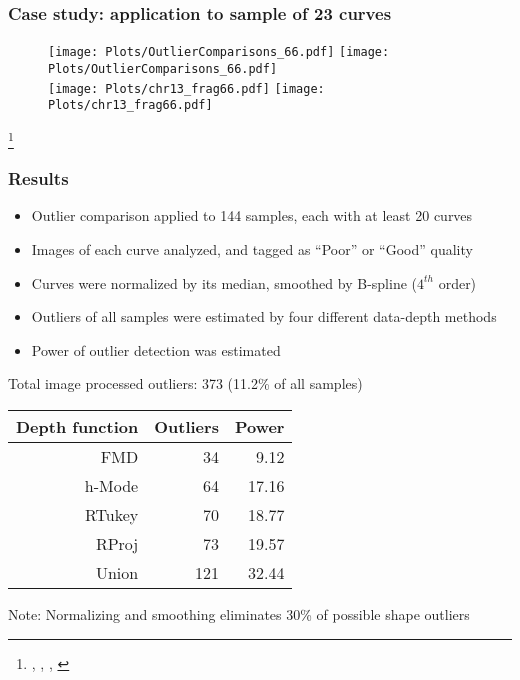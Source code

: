 \documentclass[10pt,dvipsnames,table]{beamer}
\begin{document}
\begin{frame}
\frametitle{Case study: application to sample of 23 curves}
\vspace{-0.5cm}
\begin{figure}[t]
\texttt{[image: Plots/OutlierComparisons\_66.pdf]}
\hspace{0.5cm}
\pause
\texttt{[image: Plots/OutlierComparisons\_66.pdf]} \\
\texttt{[image: Plots/chr13\_frag66.pdf]}
\pause
\hspace{0.5cm}
\pause
\texttt{[image: Plots/chr13\_frag66.pdf]}
\end{figure}
\footnote{\cite{Febrero-Bande_delaFuente_2012_JSS}, \cite{R-fda}, \cite{Ramsay_Silverman_2002_Applied}, \cite{Ramsay_etal_2009_Functional_R}}
\end{frame}

\begin{frame}
\frametitle{Results}
\begin{itemize}
\item Outlier comparison applied to 144 samples, each with at least 20 curves
\item Images of each curve analyzed, and tagged as ``Poor'' or ``Good'' quality
\item Curves were normalized by its median, smoothed by B-spline ($4^{th}$ order)
\item Outliers of all samples were estimated by four different data-depth methods
\item Power of outlier detection was estimated
\end{itemize}
\pause
Total image processed outliers: 373 (11.2\% of all samples) \\
\begin{table}[ht]
\centering
\begin{tabular}{rrr}
  \hline
  \hline
  Depth function & Outliers & Power \\ 
  \hline
  FMD & 34 & 9.12 \\ 
  h-Mode & 64 & 17.16 \\ 
  RTukey & 70 & 18.77 \\ 
  RProj & 73 & 19.57 \\ 
  Union & 121 & 32.44 \\ 
  \hline
  \hline
\end{tabular}
\end{table}
Note: Normalizing and smoothing eliminates 30\% of possible shape outliers
\end{frame}
\end{document}
